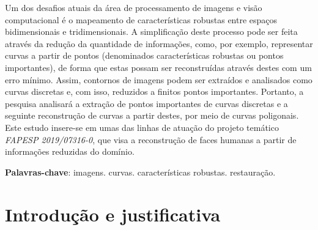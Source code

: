 \documentclass[
	12pt,				%
	oneside,			%
	a4paper,			%
	sumario=tradicional,
	english,			%
	french,				%
	spanish,			%
	brazil,				%
]{abntex2}
\begin{document}

\frenchspacing 


 \imprimirfolhaderosto

\begin{resumoumacoluna}

Um dos desafios atuais da área de processamento de imagens e visão computacional é o mapeamento de características robustas entre espaços bidimensionais e tridimensionais. A simplificação deste processo pode ser feita através da redução da quantidade de informações, como, por exemplo, representar curvas a partir de pontos (denominados características robustas ou pontos importantes), de forma que estas possam ser reconstruídas através destes com um erro mínimo. Assim, contornos de imagens podem ser extraídos e analisados como curvas discretas e, com isso, reduzidos a finitos pontos importantes. Portanto, a pesquisa analisará a extração de pontos importantes de curvas discretas e a seguinte reconstrução de curvas a partir destes, por meio de curvas poligonais. Este estudo insere-se em umas das linhas de atuação do projeto temático \textit{FAPESP 2019/07316-0}, que visa a reconstrução de faces humanas a partir de informações reduzidas do domínio.
 
 \vspace{\onelineskip}
 
 \noindent
 \textbf{Palavras-chave}: imagens. curvas. características robustas. restauração.
\end{resumoumacoluna}

\tableofcontents*
\cleardoublepage

\textual
\pagestyle{simple}

\begingroup
\let\clearpage\relax

\chapter{Introdução e justificativa}
\end{document}
